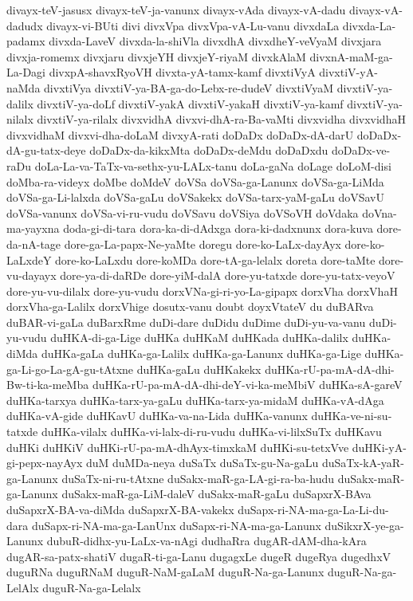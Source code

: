 {divayx-teV-jasusx
divayx-teV-ja-vanunx
divayx-vAda
divayx-vA-dadu
divayx-vA-dadudx
divayx-vi-BUti
divi
divxVpa
divxVpa-vA-Lu-vanu
divxdaLa
divxda-La-padamx
divxda-LaveV
divxda-la-shiVla
divxdhA
divxdheY-veVyaM
divxjara
divxja-romemx
divxjaru
divxjeYH
divxjeY-riyaM
divxkAlaM
divxnA-maM-ga-La-Dagi
divxpA-shavxRyoVH
divxta-yA-tamx-kamf
divxtiVyA
divxtiV-yA-naMda
divxtiVya
divxtiV-ya-BA-ga-do-Lebx-re-dudeV
divxtiVyaM
divxtiV-ya-dalilx
divxtiV-ya-doLf
divxtiV-yakA
divxtiV-yakaH
divxtiV-ya-kamf
divxtiV-ya-nilalx
divxtiV-ya-rilalx
divxvidhA
divxvi-dhA-ra-Ba-vaMti
divxvidha
divxvidhaH
divxvidhaM
divxvi-dha-doLaM
divxyA-rati
doDaDx
doDaDx-dA-darU
doDaDx-dA-gu-tatx-deye
doDaDx-da-kikxMta
doDaDx-deMdu
doDaDxdu
doDaDx-ve-raDu
doLa-La-va-TaTx-va-sethx-yu-LALx-tanu
doLa-gaNa
doLage
doLoM-disi
doMba-ra-videyx
doMbe
doMdeV
doVSa
doVSa-ga-Lanunx
doVSa-ga-LiMda
doVSa-ga-Li-lalxda
doVSa-gaLu
doVSakekx
doVSa-tarx-yaM-gaLu
doVSavU
doVSa-vanunx
doVSa-vi-ru-vudu
doVSavu
doVSiya
doVSoVH
doVdaka
doVna-ma-yayxna
doda-gi-di-tara
dora-ka-di-dAdxga
dora-ki-dadxnunx
dora-kuva
dore-da-nA-tage
dore-ga-La-papx-Ne-yaMte
doregu
dore-ko-LaLx-dayAyx
dore-ko-LaLxdeY
dore-ko-LaLxdu
dore-koMDa
dore-tA-ga-lelalx
doreta
dore-taMte
dore-vu-dayayx
dore-ya-di-daRDe
dore-yiM-dalA
dore-yu-tatxde
dore-yu-tatx-veyoV
dore-yu-vu-dilalx
dore-yu-vudu
dorxVNa-gi-ri-yo-La-gipapx
dorxVha
dorxVhaH
dorxVha-ga-Lalilx
dorxVhige
dosutx-vanu
doubt
doyxVtateV
du
duBARva
duBAR-vi-gaLa
duBarxRme
duDi-dare
duDidu
duDime
duDi-yu-va-vanu
duDi-yu-vudu
duHKA-di-ga-Lige
duHKa
duHKaM
duHKada
duHKa-dalilx
duHKa-diMda
duHKa-gaLa
duHKa-ga-Lalilx
duHKa-ga-Lanunx
duHKa-ga-Lige
duHKa-ga-Li-go-La-gA-gu-tAtxne
duHKa-gaLu
duHKakekx
duHKa-rU-pa-mA-dA-dhi-Bw-ti-ka-meMba
duHKa-rU-pa-mA-dA-dhi-deY-vi-ka-meMbiV
duHKa-sA-gareV
duHKa-tarxya
duHKa-tarx-ya-gaLu
duHKa-tarx-ya-midaM
duHKa-vA-dAga
duHKa-vA-gide
duHKavU
duHKa-va-na-Lida
duHKa-vanunx
duHKa-ve-ni-su-tatxde
duHKa-vilalx
duHKa-vi-lalx-di-ru-vudu
duHKa-vi-lilxSuTx
duHKavu
duHKi
duHKiV
duHKi-rU-pa-mA-dhAyx-timxkaM
duHKi-su-tetxVve
duHKi-yA-gi-pepx-nayAyx
duM
duMDa-neya
duSaTx
duSaTx-gu-Na-gaLu
duSaTx-kA-yaR-ga-Lanunx
duSaTx-ni-ru-tAtxne
duSakx-maR-ga-LA-gi-ra-ba-hudu
duSakx-maR-ga-Lanunx
duSakx-maR-ga-LiM-daleV
duSakx-maR-gaLu
duSapxrX-BAva
duSapxrX-BA-va-diMda
duSapxrX-BA-vakekx
duSapx-ri-NA-ma-ga-La-Li-du-dara
duSapx-ri-NA-ma-ga-LanUnx
duSapx-ri-NA-ma-ga-Lanunx
duSikxrX-ye-ga-Lanunx
dubuR-didhx-yu-LaLx-va-nAgi
dudhaRra
dugAR-dAM-dha-kAra
dugAR-sa-patx-shatiV
dugaR-ti-ga-Lanu
dugagxLe
dugeR
dugeRya
dugedhxV
duguRNa
duguRNaM
duguR-NaM-gaLaM
duguR-Na-ga-Lanunx
duguR-Na-ga-LelAlx
duguR-Na-ga-Lelalx
}

